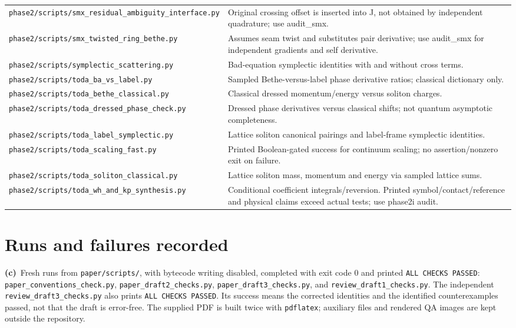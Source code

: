 \documentclass[11pt,a4paper]{article}
\newcommand{\C}{\textbf{(c)}\ }
\newcommand{\file}[1]{\nolinkurl{#1}}
\begin{document}
\begin{longtable}{@{}L{6.0cm}L{9.2cm}@{}}
\file{phase2/scripts/smx_residual_ambiguity_interface.py} & Original crossing offset is inserted into J, not obtained by independent quadrature; use audit\_smx.\\
\file{phase2/scripts/smx_twisted_ring_bethe.py} & Assumes seam twist and substitutes pair derivative; use audit\_smx for independent gradients and self derivative.\\
\file{phase2/scripts/symplectic_scattering.py} & Bad-equation symplectic identities with and without cross terms.\\
\file{phase2/scripts/toda_ba_vs_label.py} & Sampled Bethe-versus-label phase derivative ratios; classical dictionary only.\\
\file{phase2/scripts/toda_bethe_classical.py} & Classical dressed momentum/energy versus soliton charges.\\
\file{phase2/scripts/toda_dressed_phase_check.py} & Dressed phase derivatives versus classical shifts; not quantum asymptotic completeness.\\
\file{phase2/scripts/toda_label_symplectic.py} & Lattice soliton canonical pairings and label-frame symplectic identities.\\
\file{phase2/scripts/toda_scaling_fast.py} & Printed Boolean-gated success for continuum scaling; no assertion/nonzero exit on failure.\\
\file{phase2/scripts/toda_soliton_classical.py} & Lattice soliton mass, momentum and energy via sampled lattice sums.\\
\file{phase2/scripts/toda_wh_and_kp_synthesis.py} & Conditional coefficient integrals/reversion. Printed symbol/contact/reference and physical claims exceed actual tests; use phase2i audit.\\
\bottomrule
\end{longtable}
\normalsize

\section{Runs and failures recorded}
\C Fresh runs from \file{paper/scripts/}, with bytecode writing disabled,
completed with exit code 0 and printed \file{ALL CHECKS PASSED}:
\file{paper_conventions_check.py}, \file{paper_draft2_checks.py},
\file{paper_draft3_checks.py}, and \file{review_draft1_checks.py}.
The independent \file{review_draft3_checks.py} also prints
\file{ALL CHECKS PASSED}. Its success means the corrected identities and
the identified counterexamples passed, not that the draft is error-free.
The supplied PDF is built twice with \file{pdflatex}; auxiliary files and
rendered QA images are kept outside the repository.
\end{document}

